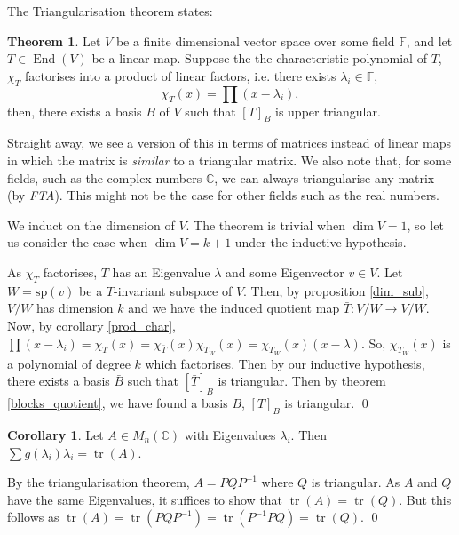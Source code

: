 \documentclass[
]{article}
\theoremstyle{definition}
\newtheorem{theorem}{Theorem}
\newtheorem{corollary}{Corollary}[theorem]
\theoremstyle{definition}
\begin{document}
The Triangularisation theorem states:

\begin{theorem}
  Let \(V\) be a finite dimensional vector space over some field \(\mathbb{F}\), 
  and let \(T \in \mathop{\mathrm{End}}(V)\) be a linear map. Suppose the the characteristic 
  polynomial of \(T\), \(\chi_T\) factorises into a product of linear factors, 
  i.e. there exists \(\lambda_i \in \mathbb{F}\), 
  \[\chi_T(x) = \prod (x - \lambda_i),\]
  then, there exists a basis \(B\) of \(V\) such that \([T]_B\) is upper 
  triangular.
\end{theorem}

Straight away, we see a version of this in terms of matrices instead of
linear maps in which the matrix is \emph{similar} to a triangular
matrix. We also note that, for some fields, such as the complex numbers
\(\mathbb{C}\), we can always triangularise any matrix (by \emph{FTA}).
This might not be the case for other fields such as the real numbers.

\proof

We induct on the dimension of \(V\). The theorem is trivial when
\(\dim V = 1\), so let us consider the case when \(\dim V = k + 1\)
under the inductive hypothesis.

As \(\chi_T\) factorises, \(T\) has an Eigenvalue \(\lambda\) and some
Eigenvector \(v \in V\). Let \(W = \text{sp}(v)\) be a \(T\)-invariant
subspace of \(V\). Then, by proposition \ref{dim_sub}, \(V / W\) has
dimension \(k\) and we have the induced quotient map
\(\bar{T} : V / W \to V / W\). Now, by corollary \ref{prod_char},
\(\prod (x - \lambda_i) = \chi_T(x) =  \chi_{\bar{T}}(x) \chi_{T_W}(x) = \chi_{T_W}(x)(x - \lambda)\).
So, \(\chi_{T_W}(x)\) is a polynomial of degree \(k\) which factorises.
Then by our inductive hypothesis, there exists a basis \(\bar{B}\) such
that \([\bar{T}]_{\bar{B}}\) is triangular. Then by theorem
\ref{blocks_quotient}, we have found a basis \(B\), \([T]_B\) is
triangular. \qed

\begin{corollary}
  Let \(A \in M_n(\mathbb{C})\) with Eigenvalues \(\lambda_i\). Then 
  \(\sum g(\lambda_i)\lambda_i = \mathop{\mathrm{tr}}(A)\).
\end{corollary}
\proof

By the triangularisation theorem, \(A = PQP^{-1}\) where \(Q\) is
triangular. As \(A\) and \(Q\) have the same Eigenvalues, it suffices to
show that \(\mathop{\mathrm{tr}}(A) = \mathop{\mathrm{tr}}(Q)\). But
this follows as
\(\mathop{\mathrm{tr}}(A) = \mathop{\mathrm{tr}}(PQP^{-1}) =  \mathop{\mathrm{tr}}(P^{-1}PQ) = \mathop{\mathrm{tr}}(Q)\).
\qed
\end{document}
